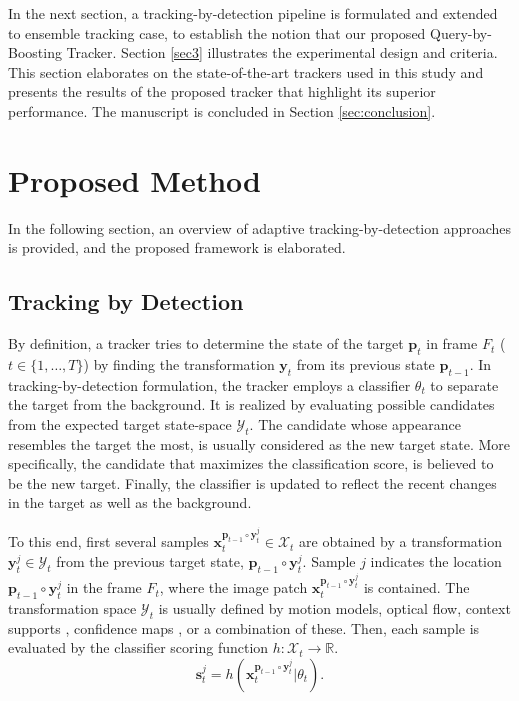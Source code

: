 \documentclass[10pt, conference, compsocconf]{IEEEtran}
\begin{document}
In the next section, a tracking-by-detection pipeline is formulated and extended to ensemble tracking case, to establish the notion that our proposed Query-by-Boosting Tracker. Section \ref{sec3} illustrates the experimental design and criteria. This section elaborates on the state-of-the-art trackers used in this study and presents the results of the proposed tracker that highlight its superior performance. The manuscript is concluded in Section \ref{sec:conclusion}. 

\section{Proposed Method}
\label{sec2}
In the following section, an overview of adaptive tracking-by-detection approaches is provided, and the proposed framework is elaborated.

\subsection{Tracking by Detection}
By definition, a tracker tries to determine the state of the target $\mathbf{p}_t$ in frame $F_t$ ($t \in \{1,\ldots,T\}$) by finding the transformation $\mathbf{y}_t$ from its previous state $\mathbf{p}_{t-1}$. In tracking-by-detection formulation, the tracker employs a classifier $\theta_t$ to separate the target from the background. It is realized by evaluating possible candidates from the expected target state-space $\mathcal{Y}_t$. The candidate whose appearance resembles the target the most, is usually considered as the new target state. More specifically, the candidate that maximizes the classification score, is believed to be the new target. Finally, the classifier is updated to reflect the recent changes in the target as well as the background.

To this end, first several samples $\mathbf{x}_t^{\mathbf{p}_{t-1} \circ \mathbf{y}_t^j}  \in \mathcal{X}_t$ are obtained by a transformation $\mathbf{y}^j_t \in \mathcal{Y}_t$ from the previous target state, $\mathbf{p}_{t-1} \circ \mathbf{y}^j_t$. Sample $j$ indicates the location $\mathbf{p}_{t-1} \circ \mathbf{y}_t^j$ in the frame $F_t$, where the image patch $\mathbf{x}_t^{\mathbf{p}_{t-1} \circ \mathbf{y}_t^j}$ is contained. The transformation space $\mathcal{Y}_t$ is usually defined by motion models, optical flow, context supports \cite{grabner2010tracking}, confidence maps \cite{tang2007co}, or a combination of these. Then, each sample is evaluated by the classifier scoring function $h: \mathcal{X}_t \rightarrow \mathbb{R}$.
\begin{equation}
\mathbf{s}^j_t = h(\mathbf{x}_t^{\mathbf{p}_{t-1} \circ \mathbf{y}_t^j} | \theta_t).
\label{eq:score_single}
\end{equation}
\end{document}

